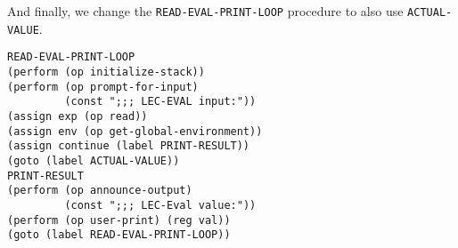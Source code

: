 \documentclass[a4paper,12pt]{article}
\begin{document}
And finally, we change the \lstinline!READ-EVAL-PRINT-LOOP! procedure
to also use \lstinline!ACTUAL-VALUE!.

\begin{lstlisting}
READ-EVAL-PRINT-LOOP
(perform (op initialize-stack))
(perform (op prompt-for-input)
         (const ";;; LEC-EVAL input:"))
(assign exp (op read))
(assign env (op get-global-environment))
(assign continue (label PRINT-RESULT))
(goto (label ACTUAL-VALUE))
PRINT-RESULT
(perform (op announce-output)
         (const ";;; LEC-Eval value:"))
(perform (op user-print) (reg val))
(goto (label READ-EVAL-PRINT-LOOP))
\end{lstlisting}
\end{document}
